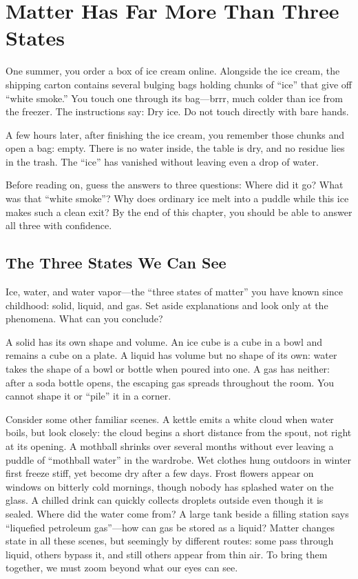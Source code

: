 \chapter{Matter Has Far More Than Three States}

\begin{kaichang}
One summer, you order a box of ice cream online. Alongside the ice cream, the shipping carton contains several bulging bags holding chunks of ``ice'' that give off ``white smoke.'' You touch one through its bag---brrr, much colder than ice from the freezer. The instructions say: Dry ice. Do not touch directly with bare hands.

A few hours later, after finishing the ice cream, you remember those chunks and open a bag: empty. There is no water inside, the table is dry, and no residue lies in the trash. The ``ice'' has vanished without leaving even a drop of water.

Before reading on, guess the answers to three questions: Where did it go? What was that ``white smoke''? Why does ordinary ice melt into a puddle while this ice makes such a clean exit? By the end of this chapter, you should be able to answer all three with confidence.
\end{kaichang}

\section{The Three States We Can See}

Ice, water, and water vapor---the ``three states of matter'' you have known since childhood: solid, liquid, and gas. Set aside explanations and look only at the phenomena. What can you conclude?

A solid has its own shape and volume. An ice cube is a cube in a bowl and remains a cube on a plate. A liquid has volume but no shape of its own: water takes the shape of a bowl or bottle when poured into one. A gas has neither: after a soda bottle opens, the escaping gas spreads throughout the room. You cannot shape it or ``pile'' it in a corner.

Consider some other familiar scenes. A kettle emits a white cloud when water boils, but look closely: the cloud begins a short distance from the spout, not right at its opening. A mothball shrinks over several months without ever leaving a puddle of ``mothball water'' in the wardrobe. Wet clothes hung outdoors in winter first freeze stiff, yet become dry after a few days. Frost flowers appear on windows on bitterly cold mornings, though nobody has splashed water on the glass. A chilled drink can quickly collects droplets outside even though it is sealed. Where did the water come from? A large tank beside a filling station says ``liquefied petroleum gas''---how can gas be stored as a liquid? Matter changes state in all these scenes, but seemingly by different routes: some pass through liquid, others bypass it, and still others appear from thin air. To bring them together, we must zoom beyond what our eyes can see.

